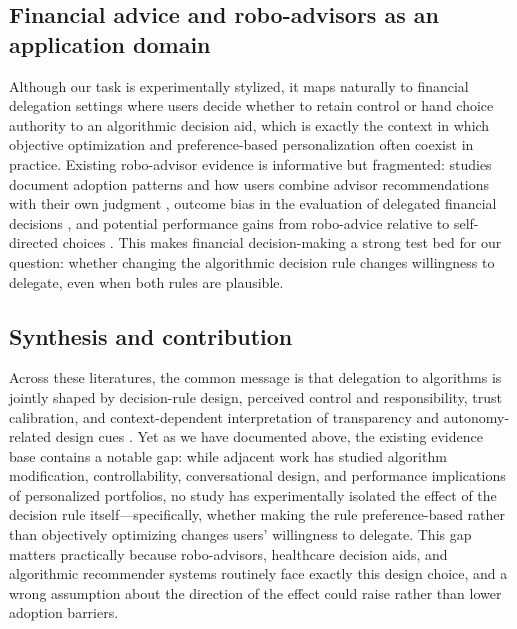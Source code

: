 \documentclass[a4paper, 12pt, fleqn]{article}
\theoremstyle{definition}
\begin{document}
\subsection{Financial advice and robo-advisors as an application domain}
Although our task is experimentally stylized, it maps naturally to financial delegation settings where users decide whether to retain control or hand choice authority to an algorithmic decision aid, which is exactly the context in which objective optimization and preference-based personalization often coexist in practice. Existing robo-advisor evidence is informative but fragmented: studies document adoption patterns and how users combine advisor recommendations with their own judgment \citep{Figa-Talamanca2022,Mahmud2025}, outcome bias in the evaluation of delegated financial decisions \citep{Ismagilova2025}, and potential performance gains from robo-advice relative to self-directed choices \citep{Lambrecht2023}. This makes financial decision-making a strong test bed for our question: whether changing the algorithmic decision rule changes willingness to delegate, even when both rules are plausible.

\subsection{Synthesis and contribution}
Across these literatures, the common message is that delegation to algorithms is jointly shaped by decision-rule design, perceived control and responsibility, trust calibration, and context-dependent interpretation of transparency and autonomy-related design cues \citep{Dietvorst2018,Chugunova2022,Schaap2024,Fink2024,Hu2024}. Yet as we have documented above, the existing evidence base contains a notable gap: while adjacent work has studied algorithm modification, controllability, conversational design, and performance implications of personalized portfolios, no study has experimentally isolated the effect of the decision rule itself---specifically, whether making the rule preference-based rather than objectively optimizing changes users' willingness to delegate. This gap matters practically because robo-advisors, healthcare decision aids, and algorithmic recommender systems routinely face exactly this design choice, and a wrong assumption about the direction of the effect could raise rather than lower adoption barriers.
\end{document}
